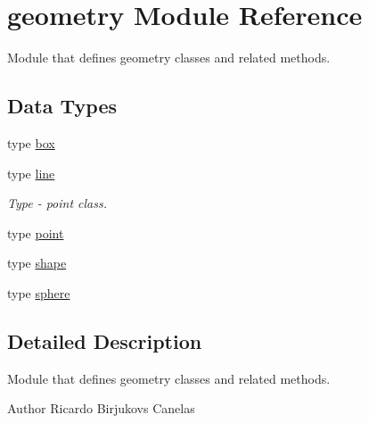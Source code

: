\hypertarget{namespacegeometry}{}\section{geometry Module Reference}
\label{namespacegeometry}


Module that defines geometry classes and related methods.  


\subsection*{Data Types}
\begin{DoxyCompactItemize}
\item 
type \mbox{\hyperlink{structgeometry_1_1box}{box}}
\item 
type \mbox{\hyperlink{structgeometry_1_1line}{line}}
\begin{DoxyCompactList}\small\item\em Type -\/ point class. \end{DoxyCompactList}\item 
type \mbox{\hyperlink{structgeometry_1_1point}{point}}
\item 
type \mbox{\hyperlink{structgeometry_1_1shape}{shape}}
\item 
type \mbox{\hyperlink{structgeometry_1_1sphere}{sphere}}
\end{DoxyCompactItemize}


\subsection{Detailed Description}
Module that defines geometry classes and related methods. 

\begin{DoxyAuthor}{Author}
Ricardo Birjukovs Canelas 
\end{DoxyAuthor}
